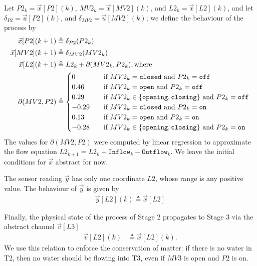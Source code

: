 {%
Let $P2_k=\vec{x}[P2](k)$, $MV2_k=\vec{x}[MV2](k)$, and $L2_k=\vec{x}[L2](k)$, and let $\delta_{P2}=\vec{u}[P2](k)$, and $\delta_{MV2}=\vec{u}[MV2](k)$; we define the behaviour of the process by
\begin{align*}
\vec{x}[P2](k+1)&\triangleq \delta_{P2}(P2_k)\\
\vec{x}[MV2](k+1)&\triangleq \delta_{MV2}(MV2_k)\\
\vec{x}[L2](k+1)&\triangleq L2_k+\partial(MV2_k,P2_k),\text{where}\\
\partial(MV2,P2)&\triangleq
\begin{cases}
  0&\quad \text{if $MV2_k=\texttt{closed}$ and $P2_k=\texttt{off}$}\\
  0.46&\quad \text{if $MV2_k=\texttt{open}$ and $P2_k=\texttt{off}$}\\
  0.29&\quad \text{if $MV2_k\in\left\{\texttt{opening},\texttt{closing}\right\}$ and $P2_k=\texttt{off}$}\\
  -0.29&\quad \text{if $MV2_k=\texttt{closed}$ and $P2_k=\texttt{on}$}\\
  0.13&\quad \text{if $MV2_k=\texttt{open}$ and $P2_k=\texttt{on}$}\\
  -0.28&\quad \text{if $MV2_k\in\left\{\texttt{opening},\texttt{closing}\right\}$ and $P2_k=\texttt{on}$}\\  
\end{cases}
\end{align*}
The values for $\partial(MV2,P2)$ were computed by linear regression to approximate the flow equation $L2_{k+1}=L2_{k}+\texttt{Inflow}_k-\texttt{Outflow}_k$. We leave the initial conditions for $\vec{x}$ abstract for now. 

The sensor reading $\vec{y}$ has only one coordinate $L2$, whose range is any positive value. The behaviour of $\vec{y}$ is given by 
\begin{align}
  \vec{y}[L2](k)\triangleq\vec{x}[L2]
\end{align}

Finally, the physical state of the process of Stage 2 propagates to Stage 3 via the abstract channel $\vec{v}[L3]$
\begin{align}
  \vec{v}[L2](k)&\triangleq \vec{x}[L2](k).
\end{align}
We use this relation to enforce the conservation of matter: if there is no water in T2, then no water should be flowing into T3, even if $MV3$ is open and $P2$ is on. 

}
